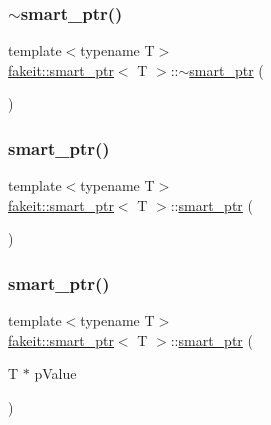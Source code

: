 \subsubsection{\texorpdfstring{$\sim$smart\_ptr()}{~smart\_ptr()}\hspace{0.1cm}{\footnotesize\ttfamily [1/9]}}
{\footnotesize\ttfamily template$<$typename T$>$ \\
\mbox{\hyperlink{classfakeit_1_1smart__ptr}{fakeit\+::smart\+\_\+ptr}}$<$ T $>$\+::$\sim$\mbox{\hyperlink{classfakeit_1_1smart__ptr}{smart\+\_\+ptr}} (\begin{DoxyParamCaption}{ }\end{DoxyParamCaption})\hspace{0.3cm}{\ttfamily [inline]}}

\mbox{\label{classfakeit_1_1smart__ptr_ad718f001e0b0815c80d5cef4f2d4a99a}} 
\subsubsection{\texorpdfstring{smart\_ptr()}{smart\_ptr()}\hspace{0.1cm}{\footnotesize\ttfamily [4/27]}}
{\footnotesize\ttfamily template$<$typename T$>$ \\
\mbox{\hyperlink{classfakeit_1_1smart__ptr}{fakeit\+::smart\+\_\+ptr}}$<$ T $>$\+::\mbox{\hyperlink{classfakeit_1_1smart__ptr}{smart\+\_\+ptr}} (\begin{DoxyParamCaption}{ }\end{DoxyParamCaption})\hspace{0.3cm}{\ttfamily [inline]}}

\mbox{\label{classfakeit_1_1smart__ptr_afa05248e2dceb62a7ecc706700cfd1bf}} 
\subsubsection{\texorpdfstring{smart\_ptr()}{smart\_ptr()}\hspace{0.1cm}{\footnotesize\ttfamily [5/27]}}
{\footnotesize\ttfamily template$<$typename T$>$ \\
\mbox{\hyperlink{classfakeit_1_1smart__ptr}{fakeit\+::smart\+\_\+ptr}}$<$ T $>$\+::\mbox{\hyperlink{classfakeit_1_1smart__ptr}{smart\+\_\+ptr}} (\begin{DoxyParamCaption}\item[{T $\ast$}]{p\+Value }\end{DoxyParamCaption})\hspace{0.3cm}{\ttfamily [inline]}}

